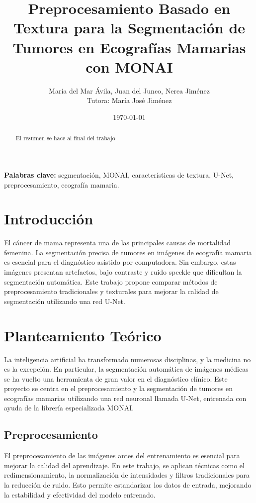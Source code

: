 \documentclass[12pt]{article}
\title{Preprocesamiento Basado en Textura para la Segmentación de Tumores en Ecografías Mamarias con MONAI}
\author{María del Mar Ávila, Juan del Junco, Nerea Jiménez\\Tutora: María José Jiménez}
\date{\today}
\begin{document}
\maketitle

\begin{abstract}
El resumen se hace al final del trabajo
\end{abstract}

\textbf{Palabras clave:} segmentación, MONAI, características de textura, U-Net, preprocesamiento, ecografía mamaria.

\section{Introducción}
El cáncer de mama representa una de las principales causas de mortalidad femenina. La segmentación precisa de tumores en imágenes de ecografía mamaria es esencial para el diagnóstico asistido por computadora. Sin embargo, estas imágenes presentan artefactos, bajo contraste y ruido speckle que dificultan la segmentación automática. Este trabajo propone comparar métodos de preprocesamiento tradicionales y texturales para mejorar la calidad de segmentación utilizando una red U-Net.

\section{Planteamiento Teórico}

La inteligencia artificial ha transformado numerosas disciplinas, y la medicina no es la excepción. En particular, la segmentación automática de imágenes médicas se ha vuelto una herramienta de gran valor en el diagnóstico clínico. Este proyecto se centra en el preprocesamiento y la segmentación de tumores en ecografías mamarias utilizando una red neuronal llamada U-Net, entrenada con ayuda de la librería especializada MONAI.

\subsection{Preprocesamiento}

El preprocesamiento de las imágenes antes del entrenamiento es esencial para mejorar la calidad del aprendizaje. En este trabajo, se aplican técnicas como el redimensionamiento, la normalización de intensidades y filtros tradicionales para la reducción de ruido. Esto permite estandarizar los datos de entrada, mejorando la estabilidad y efectividad del modelo entrenado.
\end{document}
